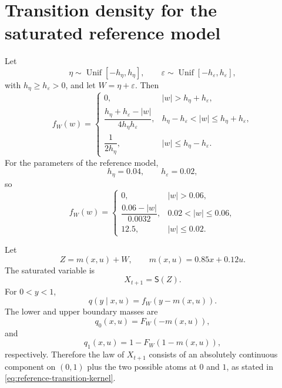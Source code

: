 \documentclass[10pt,twocolumn]{article}
\theoremstyle{remark}
\begin{document}

\section{Transition density for the saturated reference model}
\label{app:reference-transition-density}

Let
\[
\eta\sim\operatorname{Unif}[-h_\eta,h_\eta],
\qquad
\varepsilon\sim\operatorname{Unif}[-h_\varepsilon,h_\varepsilon],
\]
with \(h_\eta\geq h_\varepsilon>0\), and let \(W=\eta+\varepsilon\). Then
\begin{equation*}
	f_W(w)
	=
	\begin{cases}
		0,
		&
		|w|>h_\eta+h_\varepsilon,
		\\[1mm]
		\dfrac{h_\eta+h_\varepsilon-|w|}
		{4h_\eta h_\varepsilon},
		&
		h_\eta-h_\varepsilon<|w|
		\leq h_\eta+h_\varepsilon,
		\\[3mm]
		\dfrac{1}{2h_\eta},
		&
		|w|\leq h_\eta-h_\varepsilon.
	\end{cases}
	\label{eq:uniform-convolution-density}
\end{equation*}
For the parameters of the reference model,
\[
h_\eta=0.04,
\qquad
h_\varepsilon=0.02,
\]
so
\begin{equation*}
	f_W(w)
	=
	\begin{cases}
		0,
		&
		|w|>0.06,
		\\[1mm]
		\dfrac{0.06-|w|}{0.0032},
		&
		0.02<|w|\leq0.06,
		\\[3mm]
		12.5,
		&
		|w|\leq0.02.
	\end{cases}
	\label{eq:reference-uniform-convolution-density}
\end{equation*}

Let
\[
Z=m(x,u)+W,
\qquad
m(x,u)=0.85x+0.12u.
\]
The saturated variable is
\[
X_{t+1}=\mathsf S(Z).
\]
For \(0<y<1\),
\[
q(y\mid x,u)=f_W(y-m(x,u)).
\]
The lower and upper boundary masses are
\[
q_0(x,u)=F_W(-m(x,u)),
\]
and
\[
q_1(x,u)=1-F_W(1-m(x,u)),
\]
respectively. Therefore the law of \(X_{t+1}\) consists of an absolutely continuous component on \((0,1)\) plus the two possible atoms at \(0\) and \(1\), as stated in
\cref{eq:reference-transition-kernel}.


\balance


\end{document}
